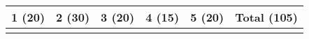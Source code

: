 \documentclass[11pt]{article}
\begin{document}
\begin{center}

{\Large
		\begin{tabular}{|c|c|c|c|c|c|} \hline
      1 (20) & 2 (30) & 3 (20) & 4 (15) & 5 (20) & Total (105) \\ \hline
			\qquad\qquad  &\qquad\qquad   &\qquad\qquad   & \qquad\qquad  &\qquad\qquad   & \qquad\qquad  \\ \hline
		\end{tabular}
}
\end{center}
\end{document}
